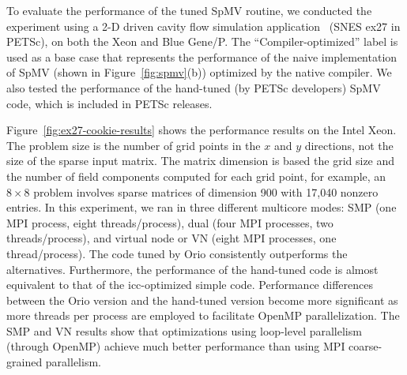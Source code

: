 To evaluate the performance of the tuned SpMV routine, we conducted the
experiment using a 2-D driven cavity flow simulation
application~\cite{coff:kell:keye} (SNES ex27 in PETSc), on both the Xeon and
Blue Gene/P. The ``Compiler-optimized'' label is used as a base case that
represents the performance of the naive implementation of SpMV (shown in
Figure~\ref{fig:spmv}(b)) optimized by the native compiler. We also tested
the performance of the hand-tuned (by PETSc developers) SpMV code, which is
included in PETSc releases.

Figure~\ref{fig:ex27-cookie-results} shows the performance results on the
Intel Xeon. The problem size is the number of grid points in the $x$ and $y$
directions, not the size of the sparse input matrix. The matrix dimension is
based the grid size and the number of field components computed for each grid
point, for example, an $8 \times 8$ problem involves sparse matrices of
dimension 900 with 17,040 nonzero entries. In this experiment, we ran in
three different multicore modes: SMP (one MPI process, eight
threads/process), dual (four MPI processes, two threads/process), and virtual
node or VN (eight MPI processes, one thread/process). The code tuned by Orio
consistently outperforms the alternatives. Furthermore, the performance of
the hand-tuned code is almost equivalent to that of the icc-optimized simple
code. Performance differences between the Orio version and the hand-tuned
version become more significant as more threads per process are employed to
facilitate OpenMP parallelization. The SMP and VN results show that
optimizations using loop-level parallelism (through OpenMP) achieve much
better performance than using MPI coarse-grained parallelism.
